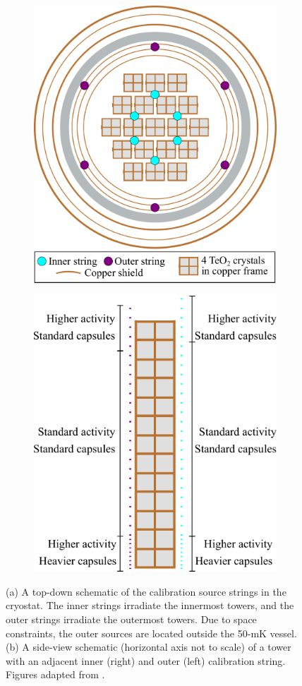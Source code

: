 \begin{figure}[htpb]
\begin{center}
\begin{subfigure}[b]{0.5\textwidth}
    \includegraphics[height=3.25 in]{Figures/CUORE_calibration_location.pdf}
    \caption{}
    \label{fig:Calibration_source_top_view}
\end{subfigure}
\begin{subfigure}[b]{0.40\textwidth}
\includegraphics[height = 3.5 in]{Figures/Cuore_tower_calibration.pdf}
\caption{}
\label{fig:Calibration_source_tower}
\end{subfigure}
\end{center}
\caption[(a) A top-down schematic of the calibration source strings in the cryostat.
(b) A side-view schematic of an inner and outer calibration string next to a tower.]
    {(a) A top-down schematic of the calibration source strings in the cryostat.
    The inner strings irradiate the innermost towers, and the outer strings irradiate the outermost towers.
    Due to space constraints, the outer sources are located outside the 50-mK vessel.
    (b) A side-view schematic (horizontal axis not to scale) of a tower with an adjacent inner (right) and outer (left)  calibration string.
    Figures adapted from \cite{Cushman:2016cnv}.}
\label{fig:Calibration_source_locations}
\end{figure}

